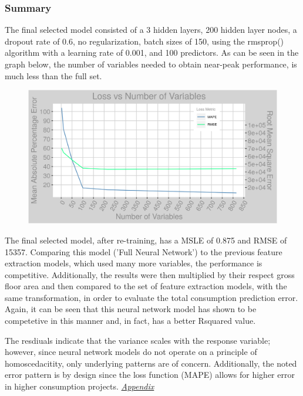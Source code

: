 \subsubsection{Summary}
The final selected model consisted of a 3 hidden layers, 200 hidden layer nodes, a dropout rate of 0.6, no regularization, batch sizes of 150, using the rmsprop() algorithm with a learning rate of 0.001, and 100 predictors.  As can be seen in the graph below, the number of variables needed to obtain near-peak performance, is much less than the full set.

\begin{figure}[h]
\centering
\includegraphics[width=\textwidth, height=0.25\textheight]{Images/electricity_psf_nn_error.png}
\end{figure}

The final selected model, after re-training, has a MSLE of 0.875 and RMSE of 15357.  Comparing this model ('Full Neural Network') to the previous feature extraction models, which used many more variables, the performance is competitive.  Additionally, the results were then multiplied by their respect gross floor area and then compared to the set of feature extraction models, with the same transformation, in order to evaluate the total consumption prediction error.  Again, it can be seen that this neural network model has shown to be competetive in this manner and, in fact, has a better Rsquared value.

The resdiuals indicate that the variance scales with the response variable; however, since neural network models do not operate on a principle of homoscedacitity, only underlying patterns are of concern. Additionally, the noted error pattern is by design since the loss function (MAPE) allows for higher error in higher consumption projects.  \textit{\hyperref[appendix_nn:electricity:nn_full]{Appendix}}

